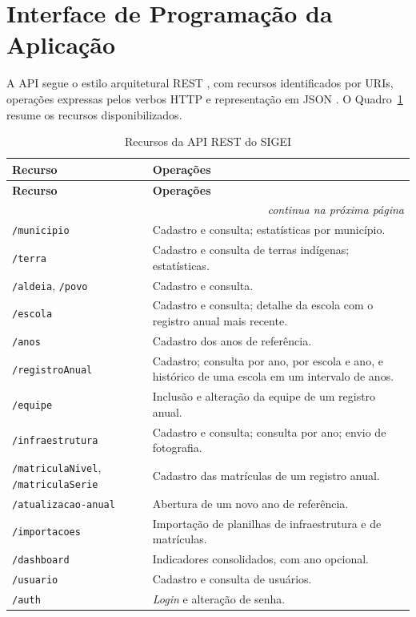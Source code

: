 \section{Interface de Programação da Aplicação}

A API segue o estilo arquitetural REST \cite{fielding2000}, com recursos identificados por URIs, operações expressas pelos verbos HTTP e representação em JSON \cite{richardson2013}. O Quadro~\ref{qua:endpoints} resume os recursos disponibilizados.

\begin{longtable}{p{4cm}p{9.5cm}}
\caption{Recursos da API REST do SIGEI}
\label{qua:endpoints} \\
\toprule
\textbf{Recurso} & \textbf{Operações} \\
\midrule
\endfirsthead
\toprule
\textbf{Recurso} & \textbf{Operações} \\
\midrule
\endhead
\midrule
\multicolumn{2}{r}{\small\textit{continua na próxima página}} \\
\endfoot
\bottomrule
\endlastfoot
\texttt{/municipio}          & Cadastro e consulta; estatísticas por município. \\[3pt]
\texttt{/terra}              & Cadastro e consulta de terras indígenas; estatísticas. \\[3pt]
\texttt{/aldeia}, \texttt{/povo} & Cadastro e consulta. \\[3pt]
\texttt{/escola}             & Cadastro e consulta; detalhe da escola com o registro anual mais recente. \\[3pt]
\texttt{/anos}               & Cadastro dos anos de referência. \\[3pt]
\texttt{/registroAnual}      & Cadastro; consulta por ano, por escola e ano, e histórico de uma escola em um intervalo de anos. \\[3pt]
\texttt{/equipe}             & Inclusão e alteração da equipe de um registro anual. \\[3pt]
\texttt{/infraestrutura}     & Cadastro e consulta; consulta por ano; envio de fotografia. \\[3pt]
\texttt{/matriculaNivel}, \texttt{/matriculaSerie} & Cadastro das matrículas de um registro anual. \\[3pt]
\texttt{/atualizacao-anual}  & Abertura de um novo ano de referência. \\[3pt]
\texttt{/importacoes}        & Importação de planilhas de infraestrutura e de matrículas. \\[3pt]
\texttt{/dashboard}          & Indicadores consolidados, com ano opcional. \\[3pt]
\texttt{/usuario}            & Cadastro e consulta de usuários. \\[3pt]
\texttt{/auth}               & \textit{Login} e alteração de senha. \\
\end{longtable}

